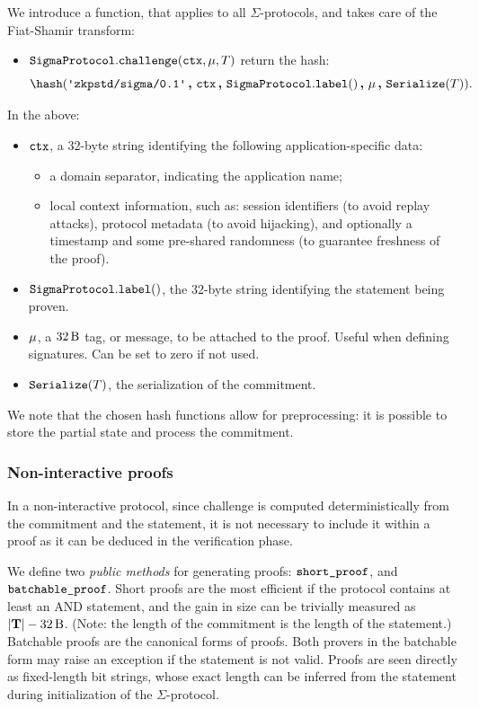 \documentclass[11pt]{article}
\begin{document}
We introduce a function, that applies to all $\Sigma$-protocols, and takes care of the Fiat-Shamir transform:
\begin{itemize}
  \item $\texttt{SigmaProtocol}.\texttt{challenge}(\texttt{ctx}, \mu, T)$
  return the hash:\[
    \hash(\domsepctx \concat \ctx \concat \sigmaprotocol.\labeltt() \concat \msg \concat  \serialize(\commitment)).
    \]
\end{itemize}
In the above:
\begin{itemize}[label=$-$]
  \item $\texttt{ctx}$, a 32-byte string identifying the following application-specific data:
  \begin{itemize}
    \item a domain separator, indicating the application name;
    \item local context information, such as:
    session identifiers (to avoid replay attacks), protocol metadata (to avoid hijacking), and optionally a timestamp and some pre-shared randomness (to guarantee freshness of the proof).
  \end{itemize}
  \item $\texttt{SigmaProtocol}.\texttt{label}()$, the 32-byte string identifying the statement being proven.
  \item $\mu$, a $\seedlen$ tag, or message, to be attached to the proof.
  Useful when defining signatures. Can be set to zero if not used.
  \item $\texttt{Serialize}(T)$, the serialization of the commitment.
\end{itemize}

We note that the chosen hash functions allow for preprocessing: it is possible to store the partial state and process the commitment.


\subsubsection{Non-interactive proofs}

In a non-interactive protocol, since challenge is computed deterministically from the commitment and the statement, it is not necessary to include it within a proof as it can be deduced in the verification phase.

We define two \emph{public methods} for generating proofs: $\texttt{short\_proof}$, and $\texttt{batchable\_proof}$.
Short proofs are the most efficient if the protocol contains at least an AND statement, and the gain in size can be trivially measured as $|\vec \commitment| - \seedlen$.
(Note: the length of the commitment is the length of the statement.)
Batchable proofs are the canonical forms of proofs.
Both provers in the batchable form may raise an exception if the statement is not valid.
Proofs are seen directly as fixed-length bit strings, whose exact length can be inferred from the statement during initialization of the $\Sigma$-protocol.
\end{document}
